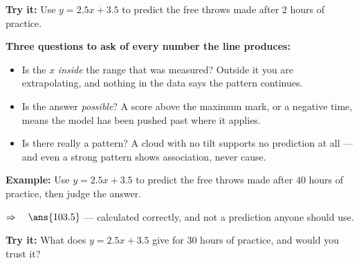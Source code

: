 \documentclass[12pt]{article}
\begin{document}
\begin{tryitbox}
\textbf{Try it:} \quad Use $y = 2.5x + 3.5$ to predict the free throws made after $2$ hours of
practice.\\[2pt]
\end{tryitbox}


\begin{formulabox}
\textbf{Three questions to ask of every number the line produces:}
\begin{itemize}[leftmargin=0.75cm, itemsep=1pt, topsep=2pt]
  \item Is the $x$ \emph{inside} the range that was measured? Outside it you are extrapolating, and
        nothing in the data says the pattern continues.
  \item Is the answer \emph{possible}? A score above the maximum mark, or a negative time, means the
        model has been pushed past where it applies.
  \item Is there really a pattern? A cloud with no tilt supports no prediction at all --- and even a
        strong pattern shows association, never cause.
\end{itemize}
\end{formulabox}

\begin{examplebox}
\textbf{Example:} \quad Use $y = 2.5x + 3.5$ to predict the free throws made after $40$ hours of
practice, then judge the answer.

$\Rightarrow\quad \ans{103.5}$ --- calculated correctly, and not a prediction anyone should use.
\end{examplebox}

\begin{tryitbox}
\textbf{Try it:} \quad What does $y = 2.5x + 3.5$ give for $30$ hours of practice, and would you
trust it?\\[2pt]
\end{tryitbox}
\end{document}
